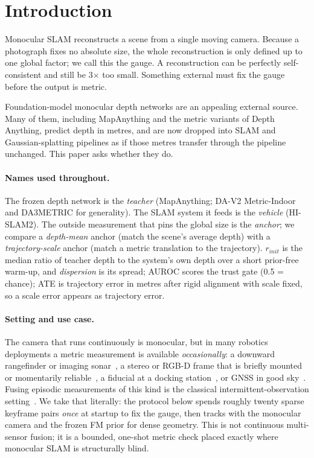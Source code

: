 \RALkeywords

\section{Introduction}

Monocular SLAM reconstructs a scene from a single moving camera. Because a
photograph fixes no absolute size, the whole reconstruction is only defined up to
one global factor; we call this the gauge. A reconstruction can be perfectly
self-consistent and still be 3$\times$ too small. Something external must fix the
gauge before the output is metric.

Foundation-model monocular depth networks are an appealing external source. Many
of them, including MapAnything and the metric variants of Depth Anything, predict
depth in metres, and are now dropped into SLAM and Gaussian-splatting pipelines
as if those metres transfer through the pipeline unchanged. This paper asks
whether they do.

\paragraph{Names used throughout.} The frozen depth network is the
\emph{teacher} (MapAnything; DA-V2 Metric-Indoor and DA3METRIC for generality).
The SLAM system it feeds is the \emph{vehicle} (HI-SLAM2). The outside
measurement that pins the global size is the \emph{anchor}; we compare a
\emph{depth-mean} anchor (match the scene's average depth) with a
\emph{trajectory-scale} anchor (match a metric translation to the trajectory).
$r_{init}$ is the median ratio of teacher depth to the system's own depth over a
short prior-free warm-up, and \emph{dispersion} is its spread; AUROC scores the
trust gate (0.5 = chance); ATE is trajectory error in metres after rigid
alignment with scale fixed, so a scale error appears as trajectory error.

\paragraph{Setting and use case.} The camera that runs continuously is monocular,
but in many robotics deployments a metric measurement is available
\emph{occasionally}: a downward rangefinder or imaging sonar~\cite{yang2022sonar},
a stereo or RGB-D frame that is briefly mounted or momentarily
reliable~\cite{murartal2017}, a fiducial at a docking station~\cite{olson2011},
or GNSS in good sky~\cite{wu2017vins}. Fusing episodic measurements of this kind
is the classical intermittent-observation setting~\cite{sinopoli2004}. We take
that literally: the protocol below spends roughly twenty sparse keyframe pairs
\emph{once} at startup to fix the gauge, then tracks with the monocular camera and
the frozen FM prior for dense geometry. This is not continuous multi-sensor
fusion; it is a bounded, one-shot metric check placed exactly where monocular
SLAM is structurally blind.

